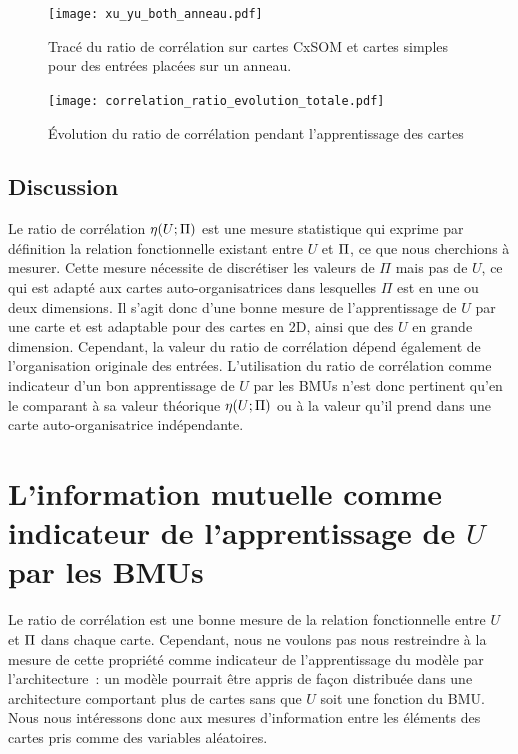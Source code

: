 \documentclass[../main]{subfiles}
\begin{document}
\begin{figure}
   \centering \texttt{[image: xu\_yu\_both\_anneau.pdf]}
    \caption{Tracé du ratio de corrélation sur cartes CxSOM et cartes simples pour des entrées placées sur un anneau.\label{fig:cr_bruit}}
\end{figure}

\begin{figure}
    \texttt{[image: correlation\_ratio\_evolution\_totale.pdf]}
    \caption{\'Evolution du ratio de corrélation pendant l'apprentissage des cartes\label{fig:cr_evol}}
\end{figure}

\subsection{Discussion}

Le ratio de corrélation $\eta(U;\Pi)$ est une mesure statistique qui exprime par définition la relation fonctionnelle existant entre $U$ et $\Pi$, ce que nous cherchions à mesurer. Cette mesure nécessite de discrétiser les valeurs de $\Pi$ mais pas de $U$, ce qui est adapté aux cartes auto-organisatrices dans lesquelles $\Pi$ est en une ou deux dimensions. Il s'agit donc d'une bonne mesure de l'apprentissage de $U$ par une carte et est adaptable pour des cartes en 2D, ainsi que des $U$ en grande dimension.
Cependant, la valeur du ratio de corrélation dépend également de l'organisation originale des entrées.
L'utilisation du ratio de corrélation comme indicateur d'un bon apprentissage de $U$ par les BMUs n'est donc pertinent qu'en le comparant à sa valeur théorique $\eta(U;\Pi)$ ou à la valeur qu'il prend dans une carte auto-organisatrice indépendante.

\section{L'information mutuelle comme indicateur de l'apprentissage de $U$ par les BMUs}

Le ratio de corrélation est une bonne mesure de la relation fonctionnelle entre $U$ et $\Pi$ dans chaque carte. Cependant, nous ne voulons pas nous restreindre à la mesure de cette propriété comme indicateur de l'apprentissage du modèle par l'architecture~: un modèle pourrait être appris de façon distribuée dans une architecture comportant plus de cartes sans que $U$ soit une fonction du BMU.
Nous nous intéressons donc aux mesures d'information entre les éléments des cartes pris comme des variables aléatoires.
\end{document}
